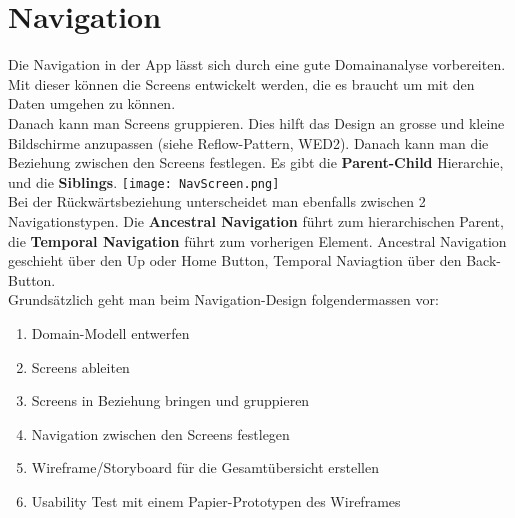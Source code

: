 \section{Navigation}
Die Navigation in der App lässt sich durch eine gute Domainanalyse vorbereiten. Mit dieser können die Screens entwickelt werden, die es braucht um mit den Daten umgehen zu können.\\
Danach kann man Screens gruppieren. Dies hilft das Design an grosse und kleine Bildschirme anzupassen (siehe Reflow-Pattern, WED2). Danach kann man die Beziehung zwischen den Screens festlegen. Es gibt die \textbf{Parent-Child} Hierarchie, und die \textbf{Siblings}.
\texttt{[image: NavScreen.png]} \\
Bei der Rückwärtsbeziehung unterscheidet man ebenfalls zwischen 2 Navigationstypen. Die \textbf{Ancestral Navigation} führt zum hierarchischen Parent, die \textbf{Temporal Navigation} führt zum vorherigen Element. Ancestral Navigation geschieht über den Up oder Home Button, Temporal Naviagtion über den Back-Button.\\
Grundsätzlich geht man beim Navigation-Design folgendermassen vor:
\begin{enumerate}
\item Domain-Modell entwerfen
\item Screens ableiten
\item Screens in Beziehung bringen und gruppieren
\item Navigation zwischen den Screens festlegen
\item Wireframe/Storyboard für die Gesamtübersicht erstellen
\item Usability Test mit einem Papier-Prototypen des Wireframes
\end{enumerate}
